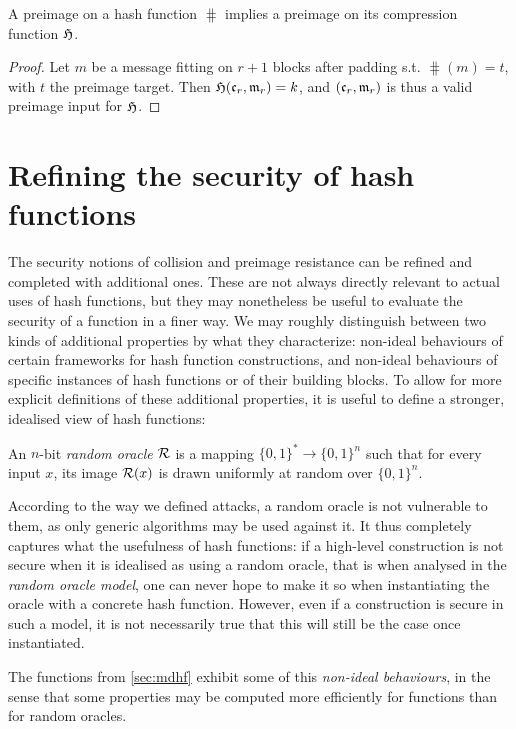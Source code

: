 \begin{prop}
A preimage on a \merkdam hash function $\hash$ implies a preimage on its compression function $\operatorname{\mathfrak{H}}$.
\end{prop}
\begin{proof}
Let $m$ be a message fitting on $r+1$ blocks after padding s.t. $\hash(m) = t$, with $t$ the preimage target.
Then $\operatorname{\mathfrak{H}}(\mathfrak{c}_r, \mathfrak{m}_r) = k$, and $(\mathfrak{c}_r, \mathfrak{m}_r)$ is thus a valid preimage input for $\operatorname{\mathfrak{H}}$.
\end{proof}

\section{Refining the security of hash functions}
\label{sec:refining_md}

The security notions of collision and preimage resistance can be refined and completed with additional ones. These are not always directly relevant to actual uses of hash functions, but they may nonetheless be useful to evaluate the security
of a function in a finer way. We may roughly distinguish between two kinds of additional properties by what they characterize: non-ideal behaviours of certain frameworks for hash function constructions, and non-ideal
behaviours of specific instances of hash functions or of their building blocks.
To allow for more explicit definitions of these additional properties, it is useful to define a stronger, idealised view of hash functions:

\begin{defi}
An $n$-bit \emph{random oracle} $\operatorname{\mathcal{R}}$ is a mapping $\{0,1\}^* \rightarrow \{0,1\}^n$ such that for every input $x$, its image $\operatorname{\mathcal{R}}(x)$ is drawn uniformly at random over $\{0,1\}^n$.
\end{defi}

According to the way we defined attacks, a random oracle is not vulnerable to them, as only generic algorithms may be used against it. It thus completely captures what
the usefulness of hash functions: if a high-level construction is not secure when it is idealised as using a random oracle, that is
when analysed in the \emph{random oracle model},
one can never hope to make it so when instantiating the oracle with a concrete hash function. However, even if a construction is secure in such a model, it is not necessarily true that
this will still be the case once instantiated.

The \merkdam functions from \autoref{sec:mdhf} exhibit some of this \emph{non-ideal behaviours},
in the sense that some properties may be computed more efficiently for \merkdam functions than for random oracles.

